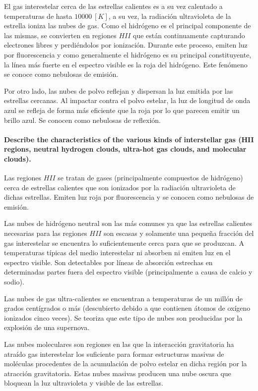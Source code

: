 \documentclass{tufte-handout}
\begin{document}
El gas interestelar cerca de las estrellas calientes es a su vez calentado a temperaturas de hasta $10000~[K]$, a su vez, la radiación ultravioleta de la estrella ioniza las nubes de gas. Como el hidrógeno es el principal componente de las mismas, se convierten en regiones $HII$ que están continuamente capturando electrones libres y perdiéndolos por ionización. Durante este proceso, emiten luz por fluorescencia y como generalmente el hidrógeno es su principal constituyente, la línea más fuerte en el espectro visible es la roja del hidrógeno. Este fenómeno se conoce como nebulosas de emisión.

Por otro lado, las nubes de polvo reflejan y dispersan la luz emitida por las estrellas cercanas. Al impactar contra el polvo estelar, la luz de longitud de onda azul se refleja de forma más eficiente que la roja por lo que parecen emitir un brillo azul. Se conocen como nebulosas de reflexión.

\paragraph{\textbf{Describe the characteristics of the various kinds of interstellar gas (HII regions, neutral hydrogen clouds,
ultra-hot gas clouds, and molecular clouds).}}

Las regiones $HII$ se tratan de gases (principalmente compuestos de hidrógeno) cerca de estrellas calientes que son ionizados por la radiación ultravioleta de dichas estrellas. Emiten luz roja por fluorescencia y se conocen como nebulosas de emisión.

Las nubes de hidrógeno neutral son las más comunes ya que las estrellas calientes necesarias para las regiones $HII$ son escasas y solamente una pequeña fracción del gas interestelar se encuentra lo suficientemente cerca para que se produzcan. A temperaturas típicas del medio interestelar ni absorben ni emiten luz en el espectro visible. Son detectables por líneas de absorción estrechas en determinadas partes fuera del espectro visible (principalmente a causa de calcio y sodio).

Las nubes de gas ultra-calientes se encuentran a temperaturas de un millón de grados centígrados o más (descubierto debido a que contienen átomos de oxígeno ionizados cinco veces). Se teoriza que este tipo de nubes son producidas por la explosión de una supernova.

Las nubes moleculares son regiones en las que la interacción gravitatoria ha atraído gas interestelar los suficiente para formar estructuras masivas de moléculas procedentes de la acumulación de polvo estelar en dicha región por la atracción gravitatoria. Estas nubes masivas producen una nube oscura que bloquean la luz ultravioleta y visible de las estrellas.
\end{document}
